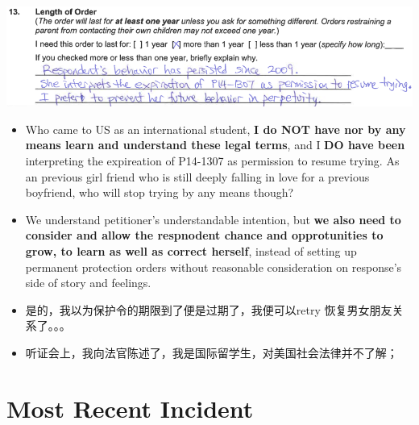 \documentclass[9pt, b5paper]{article}
\begin{document}
\includegraphics[width=.9\linewidth]{./pic/dearCousin_20220919_153711.png}
\begin{itemize}
\item Who came to US as an international student, \textbf{I do NOT have nor by any means learn and understand these legal terms}, and I \textbf{DO have been} interpreting the expireation of P14-1307 as permission to resume trying. As an previous girl friend who is still deeply falling in love for a previous boyfriend, who will stop trying by any means though?
\item We understand petitioner's understandable intention, but \textbf{we also need to consider and allow the respnodent chance and opprotunities to grow, to learn as well as correct herself}, instead of setting up permanent protection orders without reasonable consideration on response's side of story and feelings.
\item 是的，我以为保护令的期限到了便是过期了，我便可以retry 恢复男女朋友关系了。。。
\item 听证会上，我向法官陈述了，我是国际留学生，对美国社会法律并不了解；
\end{itemize}

\section{Most Recent Incident}
\label{sec-3}
\end{document}

